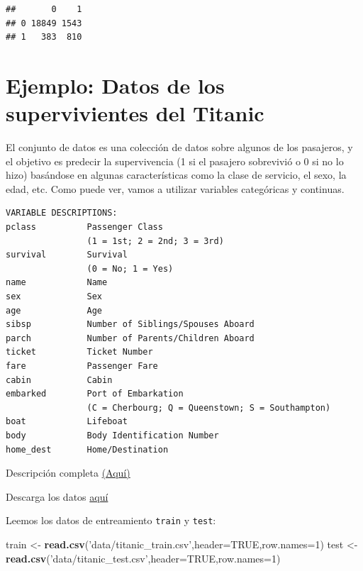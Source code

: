 \documentclass[]{book}
\newenvironment{Shaded}{\begin{snugshade}}{\end{snugshade}}
\newcommand{\KeywordTok}[1]{\textcolor[rgb]{0.13,0.29,0.53}{\textbf{#1}}}
\newcommand{\DataTypeTok}[1]{\textcolor[rgb]{0.13,0.29,0.53}{#1}}
\newcommand{\DecValTok}[1]{\textcolor[rgb]{0.00,0.00,0.81}{#1}}
\newcommand{\StringTok}[1]{\textcolor[rgb]{0.31,0.60,0.02}{#1}}
\newcommand{\OtherTok}[1]{\textcolor[rgb]{0.56,0.35,0.01}{#1}}
\newcommand{\NormalTok}[1]{#1}
\begin{document}
\begin{verbatim}
##       0    1
## 0 18849 1543
## 1   383  810
\end{verbatim}

\section{Ejemplo: Datos de los supervivientes del
Titanic}\label{ejemplo-datos-de-los-supervivientes-del-titanic}

El conjunto de datos es una colección de datos sobre algunos de los
pasajeros, y el objetivo es predecir la supervivencia (1 si el pasajero
sobrevivió o 0 si no lo hizo) basándose en algunas características como
la clase de servicio, el sexo, la edad, etc. Como puede ver, vamos a
utilizar variables categóricas y continuas.

\begin{verbatim}
VARIABLE DESCRIPTIONS:
pclass          Passenger Class
                (1 = 1st; 2 = 2nd; 3 = 3rd)
survival        Survival
                (0 = No; 1 = Yes)
name            Name
sex             Sex
age             Age
sibsp           Number of Siblings/Spouses Aboard
parch           Number of Parents/Children Aboard
ticket          Ticket Number
fare            Passenger Fare
cabin           Cabin
embarked        Port of Embarkation
                (C = Cherbourg; Q = Queenstown; S = Southampton)
boat            Lifeboat
body            Body Identification Number
home_dest       Home/Destination
\end{verbatim}

Descripción completa
\href{http://biostat.mc.vanderbilt.edu/wiki/pub/Main/DataSets/titanic3info.txt}{(Aquí)}

Descarga los datos
\href{http://idaejin.github.io/courses/R/data/titanic.zip}{aquí}

Leemos los datos de entreamiento \texttt{train} y \texttt{test}:

\begin{Shaded}
\begin{Highlighting}[]
\NormalTok{train <-}\StringTok{ }\KeywordTok{read.csv}\NormalTok{(}\StringTok{'data/titanic_train.csv'}\NormalTok{,}\DataTypeTok{header=}\OtherTok{TRUE}\NormalTok{,}\DataTypeTok{row.names=}\DecValTok{1}\NormalTok{)}
\NormalTok{ test <-}\StringTok{ }\KeywordTok{read.csv}\NormalTok{(}\StringTok{'data/titanic_test.csv'}\NormalTok{,}\DataTypeTok{header=}\OtherTok{TRUE}\NormalTok{,}\DataTypeTok{row.names=}\DecValTok{1}\NormalTok{)}
\end{Highlighting}
\end{Shaded}
\end{document}
